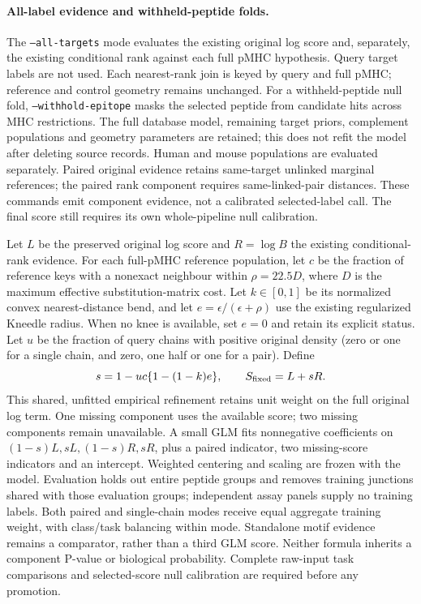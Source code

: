 \documentclass[10pt,a4paper]{article}
\theoremstyle{definition}
\begin{document}
\paragraph{All-label evidence and withheld-peptide folds.}
The \texttt{--all-targets} mode evaluates the existing original log score
and, separately, the existing conditional rank against each full pMHC
hypothesis. Query target labels are not used. Each nearest-rank join is keyed
by query and full pMHC; reference and control geometry remains unchanged.
For a withheld-peptide null fold, \texttt{--withhold-epitope} masks the selected
peptide from candidate hits across MHC restrictions. The full database model,
remaining target priors, complement populations and geometry parameters are
retained; this does not refit the model after deleting source records. Human and
mouse populations are evaluated separately. Paired original evidence retains
same-target unlinked marginal references; the paired rank component requires
same-linked-pair distances. These commands emit component evidence, not a
calibrated selected-label call. The final score still requires its own
whole-pipeline null calibration.

Let $L$ be the preserved original log score and $R=\log B$ the existing
conditional-rank evidence. For each full-pMHC reference population, let $c$ be
the fraction of reference keys with a nonexact neighbour within $\rho=22.5D$,
where $D$ is the maximum effective substitution-matrix cost. Let $k\in[0,1]$
be its normalized convex nearest-distance bend, and let
$e=\epsilon/(\epsilon+\rho)$ use the existing regularized Kneedle radius.
When no knee is available, set $e=0$ and retain its explicit status.
Let $u$ be the fraction of query chains with positive original density (zero or
one for a single chain, and zero, one half or one for a pair). Define
\[
 s=1-uc\{1-(1-k)e\},\qquad
 S_{\rm fixed}=L+sR.
\]
This shared, unfitted empirical refinement retains unit weight on the full
original log term. One missing component uses the
available score; two missing components remain unavailable. A small GLM fits
nonnegative coefficients on $(1-s)L,sL,(1-s)R,sR$, plus a paired indicator,
two missing-score indicators and an intercept. Weighted centering and scaling
are frozen with the model. Evaluation holds out entire peptide groups and
removes training junctions shared with those evaluation groups; independent
assay panels supply no training labels. Both paired and single-chain modes
receive equal aggregate training weight, with class/task balancing within mode.
Standalone motif evidence remains a comparator, rather than a third GLM score.
Neither formula inherits a component P-value or biological probability.
Complete raw-input task comparisons and selected-score null calibration are
required before any promotion.
\end{document}
